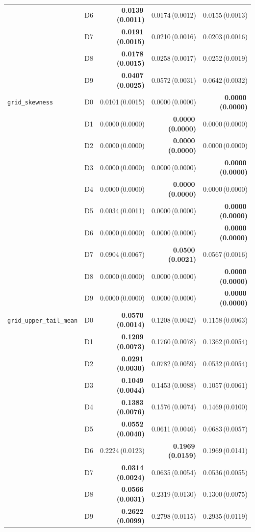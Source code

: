 \begin{longtable}{@{}llrrr@{}}
 & D6 & \textbf{0.0139\,(0.0011)} & 0.0174\,(0.0012) & 0.0155\,(0.0013) \\
 & D7 & \textbf{0.0191\,(0.0015)} & 0.0210\,(0.0016) & 0.0203\,(0.0016) \\
 & D8 & \textbf{0.0178\,(0.0015)} & 0.0258\,(0.0017) & 0.0252\,(0.0019) \\
 & D9 & \textbf{0.0407\,(0.0025)} & 0.0572\,(0.0031) & 0.0642\,(0.0032) \\
\midrule
\texttt{grid\_skewness} & D0 & 0.0101\,(0.0015) & 0.0000\,(0.0000) & \textbf{0.0000\,(0.0000)} \\
 & D1 & 0.0000\,(0.0000) & \textbf{0.0000\,(0.0000)} & 0.0000\,(0.0000) \\
 & D2 & 0.0000\,(0.0000) & \textbf{0.0000\,(0.0000)} & 0.0000\,(0.0000) \\
 & D3 & 0.0000\,(0.0000) & 0.0000\,(0.0000) & \textbf{0.0000\,(0.0000)} \\
 & D4 & 0.0000\,(0.0000) & \textbf{0.0000\,(0.0000)} & 0.0000\,(0.0000) \\
 & D5 & 0.0034\,(0.0011) & 0.0000\,(0.0000) & \textbf{0.0000\,(0.0000)} \\
 & D6 & 0.0000\,(0.0000) & 0.0000\,(0.0000) & \textbf{0.0000\,(0.0000)} \\
 & D7 & 0.0904\,(0.0067) & \textbf{0.0500\,(0.0021)} & 0.0567\,(0.0016) \\
 & D8 & 0.0000\,(0.0000) & 0.0000\,(0.0000) & \textbf{0.0000\,(0.0000)} \\
 & D9 & 0.0000\,(0.0000) & 0.0000\,(0.0000) & \textbf{0.0000\,(0.0000)} \\
\midrule
\texttt{grid\_upper\_tail\_mean} & D0 & \textbf{0.0570\,(0.0014)} & 0.1208\,(0.0042) & 0.1158\,(0.0063) \\
 & D1 & \textbf{0.1209\,(0.0073)} & 0.1760\,(0.0078) & 0.1362\,(0.0054) \\
 & D2 & \textbf{0.0291\,(0.0030)} & 0.0782\,(0.0059) & 0.0532\,(0.0054) \\
 & D3 & \textbf{0.1049\,(0.0044)} & 0.1453\,(0.0088) & 0.1057\,(0.0061) \\
 & D4 & \textbf{0.1383\,(0.0076)} & 0.1576\,(0.0074) & 0.1469\,(0.0100) \\
 & D5 & \textbf{0.0552\,(0.0040)} & 0.0611\,(0.0046) & 0.0683\,(0.0057) \\
 & D6 & 0.2224\,(0.0123) & \textbf{0.1969\,(0.0159)} & 0.1969\,(0.0141) \\
 & D7 & \textbf{0.0314\,(0.0024)} & 0.0635\,(0.0054) & 0.0536\,(0.0055) \\
 & D8 & \textbf{0.0566\,(0.0031)} & 0.2319\,(0.0130) & 0.1300\,(0.0075) \\
 & D9 & \textbf{0.2622\,(0.0099)} & 0.2798\,(0.0115) & 0.2935\,(0.0119) \\
\end{longtable}
\endgroup

